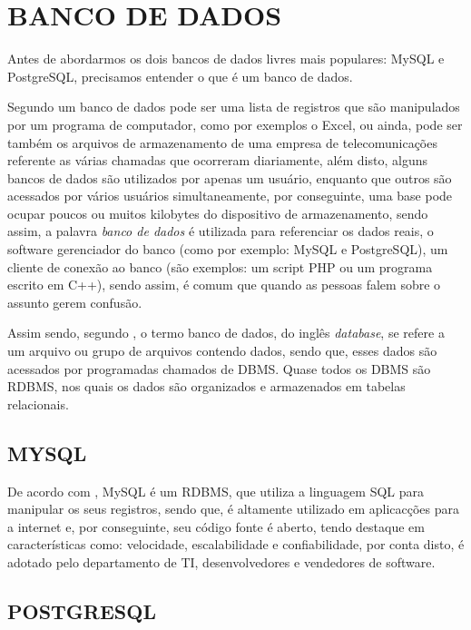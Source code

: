 \chapter{BANCO DE DADOS}
\label{bancoDeDados}

Antes de abordarmos os dois bancos de dados livres mais populares:
\acs{MySQL} e \acs{PostgreSQL}, precisamos entender o que é um banco de
dados.
 
Segundo  um banco de dados pode ser uma
lista de registros que são manipulados por um programa de computador, como por
exemplos o \acs{Excel}, ou ainda, pode ser também os arquivos de armazenamento
de uma empresa de telecomunicações referente as várias chamadas que ocorreram
diariamente, além disto, alguns bancos de dados são utilizados por apenas um
usuário, enquanto que outros são acessados por vários usuários
simultaneamente, por conseguinte, uma base pode ocupar poucos ou muitos
kilobytes do dispositivo de armazenamento, sendo assim, a palavra \textit{banco de dados} 
é utilizada para referenciar os dados reais, o software gerenciador do banco 
(como por exemplo: \acs{MySQL} e \acs{PostgreSQL}), um cliente de conexão 
ao banco (são exemplos:  um script PHP ou um programa escrito em C++), sendo 
assim, é comum que quando as pessoas falem sobre o assunto gerem confusão.

Assim sendo, segundo , o termo banco de dados, do inglês
\textit{database}, se refere a um arquivo ou grupo de arquivos contendo dados, 
sendo que, esses dados são acessados por programadas chamados de \ac{DBMS}.
Quase todos os \acs{DBMS} são \acs{RDBMS}, nos quais os dados são organizados e
armazenados em tabelas relacionais.

\section{MYSQL}

De acordo com , \acs{MySQL} é um
\ac{RDBMS},  que utiliza a linguagem \ac{SQL} para manipular os seus registros, 
sendo que, é altamente utilizado em aplicacções para a internet e, por
conseguinte,  seu código fonte é aberto, tendo destaque em características
como: velocidade, escalabilidade e confiabilidade, por conta disto, é adotado
pelo departamento de \ac{TI}, desenvolvedores e vendedores de software.

\section{POSTGRESQL}

